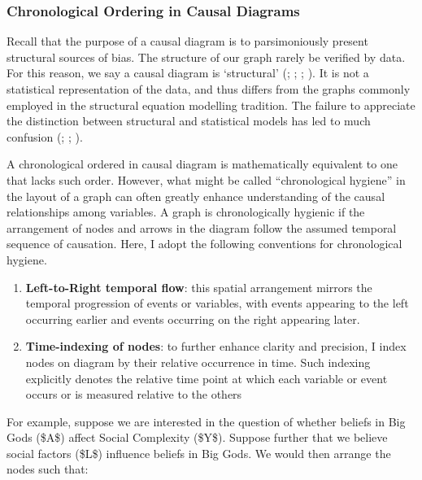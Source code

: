 \documentclass[
  singlecolumn,
  9pt]{article}
\begin{document}
\subsubsection{Chronological Ordering in Causal
Diagrams}\label{chronological-ordering-in-causal-diagrams}

Recall that the purpose of a causal diagram is to parsimoniously present
structural sources of bias. The structure of our graph rarely be
verified by data. For this reason, we say a causal diagram is
`structural' (;
;
;
). It is not a
statistical representation of the data, and thus differs from the graphs
commonly employed in the structural equation modelling tradition. The
failure to appreciate the distinction between structural and statistical
models has led to much confusion
(;
;
).

A chronological ordered in causal diagram is mathematically equivalent
to one that lacks such order. However, what might be called
``chronological hygiene'' in the layout of a graph can often greatly
enhance understanding of the causal relationships among variables. A
graph is chronologically hygienic if the arrangement of nodes and arrows
in the diagram follow the assumed temporal sequence of causation. Here,
I adopt the following conventions for chronological hygiene.

\begin{enumerate}
\def\labelenumi{\arabic{enumi}.}
\item
  \textbf{Left-to-Right temporal flow}: this spatial arrangement mirrors
  the temporal progression of events or variables, with events appearing
  to the left occurring earlier and events occurring on the right
  appearing later.
\item
  \textbf{Time-indexing of nodes}: to further enhance clarity and
  precision, I index nodes on diagram by their relative occurrence in
  time. Such indexing explicitly denotes the relative time point at
  which each variable or event occurs or is measured relative to the
  others
\end{enumerate}

For example, suppose we are interested in the question of whether
beliefs in Big Gods (\$A\$) affect Social Complexity (\$Y\$). Suppose
further that we believe social factors (\$L\$) influence beliefs in Big
Gods. We would then arrange the nodes such that:
\end{document}
